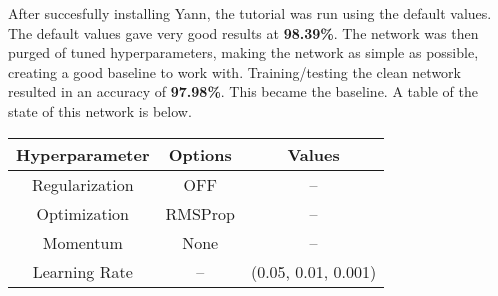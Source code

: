 \documentclass[conference,compsoc]{IEEEtran}
\begin{document}
 After succesfully installing Yann, the tutorial was run using the default values. The default values gave very good results at \textbf{98.39\%}. The network was then purged of tuned hyperparameters, making the network as simple as possible, creating a good baseline to work with. Training/testing the clean network resulted in an accuracy of \textbf{97.98\%}. This became the baseline. A table of the state of this network is below. 
 
 \renewcommand{\arraystretch}{1.1}
 \begin{center}
   \begin{tabular}{ | c | c | c | }
     \hline
     \textbf{Hyperparameter} & \textbf{Options} & \textbf{Values} \\ \hline
     Regularization & OFF & -- \\ \hline
     Optimization & RMSProp & -- \\ \hline
     Momentum &  None &  -- \\ \hline
     Learning Rate & -- & (0.05, 0.01, 0.001)  \\ \hline
   \end{tabular}
 \end{center}
\end{document}

